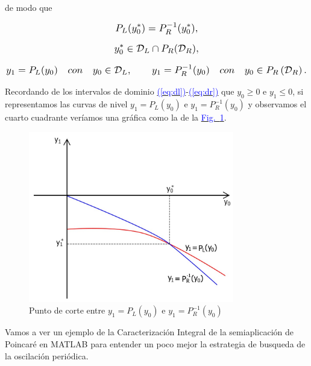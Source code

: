 \documentclass[12pt,a4paper]{report} %
\newcommand{\fref}[1]{\hyperref[#1]{\textcolor{blue}{Fig.~\ref*{#1}}}}
\newcommand{\eref}[1]{\hyperref[#1]{\textcolor{blue}{(\ref*{#1})}}}
\newcommand{\fref}[1]{\hyperref[#1]{\textcolor{blue}{\textit{Fig.~\ref*{#1}}}}}
\newcommand{\eref}[1]{\hyperref[#1]{\textcolor{blue}{\textit{(\ref*{#1})}}}}
\begin{document}
	\noindent de modo que
	
	\begin{equation*}
		\scalebox{1.2}{$\displaystyle
		P_L(y_0^*)=P_R^{-1}(y_0^*),
		$}
	\end{equation*}
	
	\begin{equation*}
		\scalebox{1.2}{$\displaystyle
		y_0^* \in \mathcal{D}_L \cap P_R(\mathcal{D}_R),
		$}
	\end{equation*}
	
	\begin{equation*}
		\scalebox{1.2}{$\displaystyle
			y_1=P_L(y_0) \quad con \quad y_0\in\mathcal{D}_L, \qquad y_1=P_R^{-1}(y_0) \quad con \quad y_0\in P_R\left(\mathcal{D}_R\right).
			$}
	\end{equation*}
	
	\vspace{0.5cm}\noindent Recordando de los intervalos de dominio \eref{eq:dl}-\eref{eq:dr} que $y_0\geq0$ e $y_1\leq0$, si representamos las curvas de nivel $y_1=P_L(y_0)$ e $y_1=P_R^{-1}(y_0)$ y observamos el cuarto cuadrante veríamos una gráfica como la de la \fref{fig:graficaejemplo}.
	
	\begin{figure}[h]
		\centering
		\includegraphics[width=0.8\textwidth]{graficaejemplo.jpg}
		\caption{Punto de corte entre $y_1=P_L(y_0)$ e $y_1=P_R^{-1}(y_0)$}
		\label{fig:graficaejemplo}
	\end{figure}\smallskip
	
	\newpage
	
	\vspace{0.5cm} Vamos a ver un ejemplo de la Caracterización Integral de la semiaplicación de Poincaré en MATLAB para entender un poco mejor la estrategia de busqueda de la oscilación periódica.
	
\end{document}
